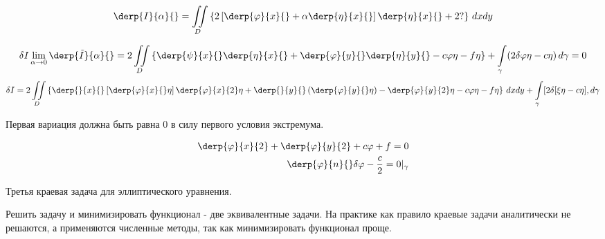 \[
	 \derp{I}{\alpha}{} = \iint\limits_D \left\{ 2 \left[ \derp{\varphi}{x}{} + \alpha \derp{\eta}{x}{}\right] \derp{\eta}{x}{} + 2 ? \right\}\, dx dy 
\]

\[
	 \delta I \lim\limits_{\alpha \to 0} \derp{\tilde I}{\alpha}{} = 2 \iint\limits_D \left\{ \derp{\psi}{x}{} \derp{\eta}{x}{} + \derp{\varphi}{y}{} \derp{\eta}{y}{} - c \varphi \eta - f \eta \right\} + \int\limits_\gamma (2 \delta \varphi \eta - c \eta)\, d \gamma = 0 
\]
\[
	\delta I = 2 \iint\limits_D \left\{ \derp{}{x}{} \left[ \derp{\varphi}{x}{} \eta \right] \derp{\varphi}{x}{2} \eta + \derp{}{y}{} \left(\derp{\varphi}{y}{} \eta \right) - \derp{\varphi}{y}{2} \eta - c \varphi \eta - f \eta \right\}\, dx dy + \int\limits_\gamma [ 2 \delta [ \xi \eta - c \eta], d \gamma 
\]


Первая вариация должна быть равна 0 в силу первого условия экстремума.

\begin{align}
   \derp{\varphi}{x}{2} + \derp{\varphi}{y}{2} + c \varphi + f = 0\\
   \derp{\varphi}{n}{} \delta \varphi - \frac{c}{2} = 0 |_\gamma
\end{align}

Третья краевая задача для эллиптического уравнения.

Решить задачу и минимизировать функционал - две эквивалентные задачи.
На практике как правило краевые задачи аналитически не решаются, а применяются численные методы, так как минимизировать функционал проще.